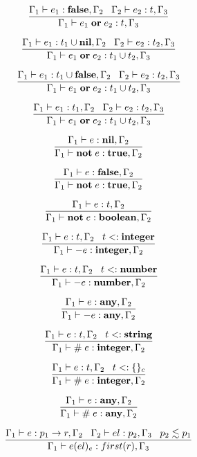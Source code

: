 \[
\dfrac{\Gamma_{1} \vdash e_{1}:\mathbf{false}, \Gamma_{2} \;\;\;
       \Gamma_{2} \vdash e_{2}:t, \Gamma_{3}}
      {\Gamma_{1} \vdash e_{1} \; \mathbf{or} \; e_{2}:t, \Gamma_{3}}
\]

\[
\dfrac{\Gamma_{1} \vdash e_{1}:t_{1} \cup \mathbf{nil}, \Gamma_{2} \;\;\;
       \Gamma_{2} \vdash e_{2}:t_{2}, \Gamma_{3}}
      {\Gamma_{1} \vdash e_{1} \; \mathbf{or} \; e_{2}:t_{1} \cup t_{2}, \Gamma_{3}}
\]

\[
\dfrac{\Gamma_{1} \vdash e_{1}:t_{1} \cup \mathbf{false}, \Gamma_{2} \;\;\;
       \Gamma_{2} \vdash e_{2}:t_{2}, \Gamma_{3}}
      {\Gamma_{1} \vdash e_{1} \; \mathbf{or} \; e_{2}:t_{1} \cup t_{2}, \Gamma_{3}}
\]

\[
\dfrac{\Gamma_{1} \vdash e_{1}:t_{1}, \Gamma_{2} \;\;\;
       \Gamma_{2} \vdash e_{2}:t_{2}, \Gamma_{3}}
      {\Gamma_{1} \vdash e_{1} \; \mathbf{or} \; e_{2}:t_{1} \cup t_{2}, \Gamma_{3}}
\]

\[
\dfrac{\Gamma_{1} \vdash e:\mathbf{nil}, \Gamma_{2}}
      {\Gamma_{1} \vdash \mathbf{not} \; e:\mathbf{true}, \Gamma_{2}}
\]

\[
\dfrac{\Gamma_{1} \vdash e:\mathbf{false}, \Gamma_{2}}
      {\Gamma_{1} \vdash \mathbf{not} \; e:\mathbf{true}, \Gamma_{2}}
\]

\[
\dfrac{\Gamma_{1} \vdash e:t, \Gamma_{2}}
      {\Gamma_{1} \vdash \mathbf{not} \; e:\mathbf{boolean}, \Gamma_{2}}
\]

\[
\dfrac{\Gamma_{1} \vdash e:t, \Gamma_{2} \;\;\;
       t <: \mathbf{integer}}
      {\Gamma_{1} \vdash - e:\mathbf{integer}, \Gamma_{2}}
\]

\[
\dfrac{\Gamma_{1} \vdash e:t, \Gamma_{2} \;\;\;
       t <: \mathbf{number}}
      {\Gamma_{1} \vdash - e:\mathbf{number}, \Gamma_{2}}
\]

\[
\dfrac{\Gamma_{1} \vdash e:\mathbf{any}, \Gamma_{2}}
      {\Gamma_{1} \vdash - e:\mathbf{any}, \Gamma_{2}}
\]

\[
\dfrac{\Gamma_{1} \vdash e:t, \Gamma_{2} \;\;\;
       t <: \mathbf{string}}
      {\Gamma_{1} \vdash \# \; e:\mathbf{integer}, \Gamma_{2}}
\]

\[
\dfrac{\Gamma_{1} \vdash e:t, \Gamma_{2} \;\;\;
       t <: \{\}_{c}}
      {\Gamma_{1} \vdash \# \; e:\mathbf{integer}, \Gamma_{2}}
\]

\[
\dfrac{\Gamma_{1} \vdash e:\mathbf{any}, \Gamma_{2}}
      {\Gamma_{1} \vdash \# \; e:\mathbf{any}, \Gamma_{2}}
\]

\[
\dfrac{\Gamma_{1} \vdash e:p_{1} \rightarrow r, \Gamma_{2} \;\;\;
       \Gamma_{2} \vdash el:p_{2}, \Gamma_{3} \;\;\;
       p_{2} \lesssim p_{1}}
      {\Gamma_{1} \vdash e(el)_{e}:first(r), \Gamma_{3}}
\]

